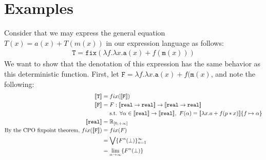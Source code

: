 \section{Examples}
Consider that we may express the general equation $T(x) = a(x) + T(m(x))$ in our expression language as follows:
 \begin{align*}
 \texttt{T} = \texttt{fix}(\lambda f. \lambda x.\texttt{a}(x) + f (\texttt{m}(x)))
 \end{align*}
 We want to show that the denotation of this expression has the same behavior as this deterministic function. First, let 
 $\texttt{F} = \lambda f. \lambda x.\texttt{a}(x) + f (\texttt{m}(x)$, and note the following:
 \begin{align*}
 \llbracket \texttt{T} \rrbracket &= fix(\llbracket \texttt{F} \rrbracket) \\
 \llbracket \texttt{F} \rrbracket &= F : \llbracket \texttt{real} \rightarrow \texttt{real}\rrbracket \rightarrow \llbracket \texttt{real} \rightarrow 
 \texttt{real}\rrbracket \\ &\text{ \ \ \ s.t. } \forall \alpha \in \llbracket \texttt{real}\rrbracket \rightarrow \llbracket \texttt{real}
 \rrbracket, \ 
 F(\alpha) = \llbracket \lambda x.a + f (p * x)\rrbracket\{f \mapsto \alpha\} \\
 \llbracket \texttt{real}\rrbracket &= \R_{[0, +\infty]}  
 \\\text{By the CPO fixpoint theorem, } fix(\llbracket \texttt{F} \rrbracket) &= fix(F) \\
&= \bigvee\{F^n (\perp)\}^{\infty}_{n=1} \\
&= \lim_{n \to \infty}\{F^n (\perp)\}
 \end{align*}

